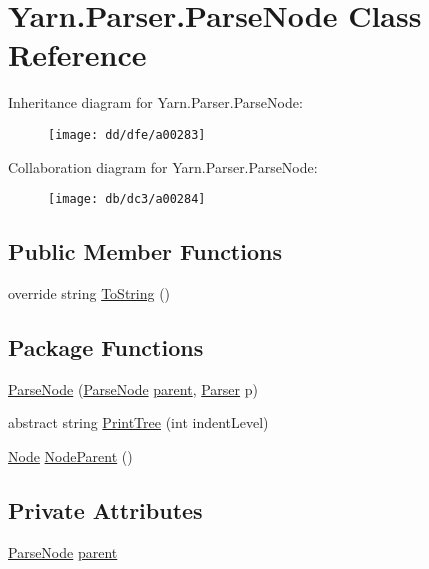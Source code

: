 \hypertarget{a00063}{\section{Yarn.\-Parser.\-Parse\-Node Class Reference}
\label{a00063}
}


Inheritance diagram for Yarn.\-Parser.\-Parse\-Node\-:
\nopagebreak
\begin{figure}[H]
\begin{center}
\leavevmode
\texttt{[image: dd/dfe/a00283]}
\end{center}
\end{figure}


Collaboration diagram for Yarn.\-Parser.\-Parse\-Node\-:
\nopagebreak
\begin{figure}[H]
\begin{center}
\leavevmode
\texttt{[image: db/dc3/a00284]}
\end{center}
\end{figure}
\subsection*{Public Member Functions}
\begin{DoxyCompactItemize}
\item 
override string \hyperlink{a00063_a18c67cb16090d0889bb9d6c8c6c565f8}{To\-String} ()
\end{DoxyCompactItemize}
\subsection*{Package Functions}
\begin{DoxyCompactItemize}
\item 
\hyperlink{a00063_a9e7e90bbaed268529230512e4b5a2f77}{Parse\-Node} (\hyperlink{a00063}{Parse\-Node} \hyperlink{a00063_af313a82103fcc2ff5a177dbb06b92f7b}{parent}, \hyperlink{a00064}{Parser} p)
\item 
abstract string \hyperlink{a00063_a0d6611653f20c2e4d90a97a96c657137}{Print\-Tree} (int indent\-Level)
\item 
\hyperlink{a00054}{Node} \hyperlink{a00063_a580e520a29444fc23ac3660cbe514a09}{Node\-Parent} ()
\end{DoxyCompactItemize}
\subsection*{Private Attributes}
\begin{DoxyCompactItemize}
\item 
\hyperlink{a00063}{Parse\-Node} \hyperlink{a00063_af313a82103fcc2ff5a177dbb06b92f7b}{parent}
\end{DoxyCompactItemize}


